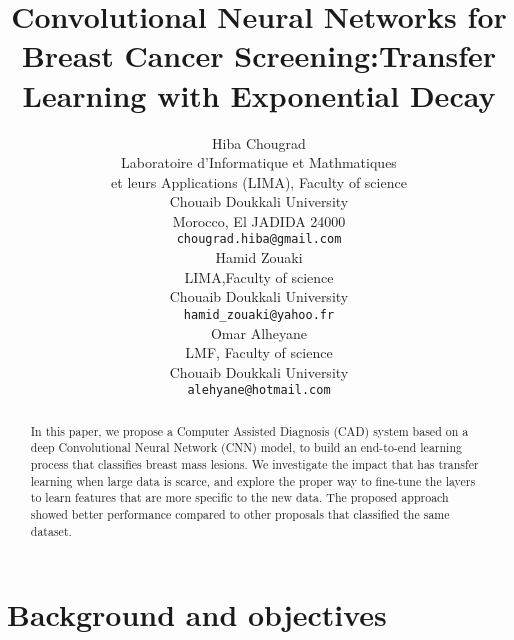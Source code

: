 \documentclass{article}
\title{Convolutional Neural Networks for Breast Cancer Screening:Transfer Learning with Exponential Decay}
\author{
  Hiba Chougrad \\
    Laboratoire d'Informatique et Mathmatiques\\ et leurs Applications (LIMA), Faculty of science\\
  Chouaib Doukkali University\\
  Morocco, El JADIDA 24000 \\
  \texttt{chougrad.hiba@gmail.com} \\
   \And
   Hamid Zouaki \\
   LIMA,Faculty of science  \\
   Chouaib Doukkali University\\
   \texttt{hamid\_zouaki@yahoo.fr} \\
   \AND
   Omar Alheyane \\
   LMF, Faculty of science \\
   Chouaib Doukkali University\\
   \texttt{alehyane@hotmail.com} \\
}
\begin{document}
\maketitle

\begin{abstract}
In this paper, we propose a Computer Assisted Diagnosis (CAD) system based on a deep Convolutional Neural Network (CNN) model, to build an end-to-end learning process that classifies breast mass lesions. We investigate the impact that has transfer learning when large data is scarce, and explore the proper way to fine-tune the layers to learn features that are more specific to the new data. The proposed approach showed better performance compared to other proposals that classified the same dataset.
\end{abstract}

\section{Background and objectives}
\end{document}
